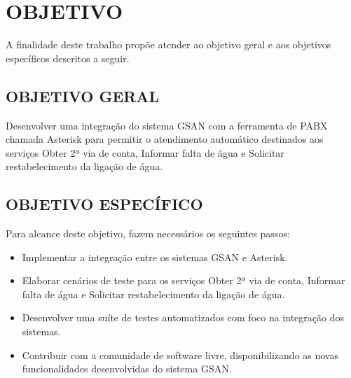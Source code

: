 \section*{\textbf{OBJETIVO}}

A finalidade deste trabalho propõe atender ao objetivo geral e aos objetivos específicos descritos a seguir.

\subsection*{\textbf{OBJETIVO GERAL}}

Desenvolver uma integração do sistema GSAN com a ferramenta de PABX chamada Asterisk para permitir o atendimento automático destinados aos serviços Obter 2ª via de conta, Informar falta de água e Solicitar restabelecimento da ligação de água.

\subsection*{\textbf{OBJETIVO ESPECÍFICO}}
Para alcance deste objetivo, fazem necessários os seguintes passos:
\begin{itemize}
	\item Implementar a integração entre os sistemas GSAN e Asterisk.
	\item Elaborar cenários de teste para os serviços Obter 2ª via de conta, Informar falta de água e Solicitar restabelecimento da ligação de água.
	\item Desenvolver uma suíte de testes automatizados com foco na integração dos sistemas. 
	\item Contribuir com a comunidade de software livre, disponibilizando as novas funcionalidades desenvolvidas do sistema GSAN.
\end{itemize}